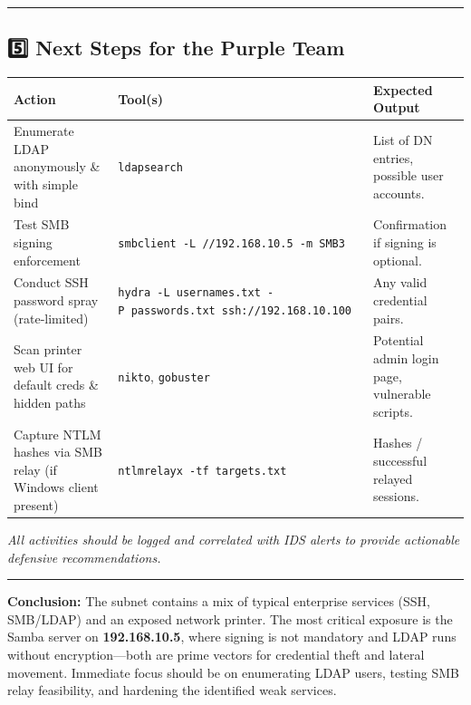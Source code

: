 \begin{center}\rule{0.5\linewidth}{0.5pt}\end{center}

\subsection{5️⃣ Next Steps for the Purple
Team}\label{next-steps-for-the-purple-team}

\begin{longtable}[]{@{}
  >{\raggedright\arraybackslash}p{}
  >{\raggedright\arraybackslash}p{}
  >{\raggedright\arraybackslash}p{}@{}}
\toprule\noalign{}
\begin{minipage}[b]{\linewidth}\raggedright
Action
\end{minipage} & \begin{minipage}[b]{\linewidth}\raggedright
Tool(s)
\end{minipage} & \begin{minipage}[b]{\linewidth}\raggedright
Expected Output
\end{minipage} \\
\midrule\noalign{}
\endhead
\bottomrule\noalign{}
\endlastfoot
Enumerate LDAP anonymously \& with simple bind & \texttt{ldapsearch} &
List of DN entries, possible user accounts. \\
Test SMB signing enforcement &
\texttt{smbclient\ -L\ //192.168.10.5\ -m\ SMB3} & Confirmation if
signing is optional. \\
Conduct SSH password spray (rate‑limited) &
\texttt{hydra\ -L\ usernames.txt\ -P\ passwords.txt\ ssh://192.168.10.100}
& Any valid credential pairs. \\
Scan printer web UI for default creds \& hidden paths & \texttt{nikto},
\texttt{gobuster} & Potential admin login page, vulnerable scripts. \\
Capture NTLM hashes via SMB relay (if Windows client present) &
\texttt{ntlmrelayx\ -tf\ targets.txt} & Hashes / successful relayed
sessions. \\
\end{longtable}

\emph{All activities should be logged and correlated with IDS alerts to
provide actionable defensive recommendations.}

\begin{center}\rule{0.5\linewidth}{0.5pt}\end{center}

\textbf{Conclusion:} The subnet contains a mix of typical enterprise
services (SSH, SMB/LDAP) and an exposed network printer. The most
critical exposure is the Samba server on \textbf{192.168.10.5}, where
signing is not mandatory and LDAP runs without encryption---both are
prime vectors for credential theft and lateral movement. Immediate focus
should be on enumerating LDAP users, testing SMB relay feasibility, and
hardening the identified weak services.
